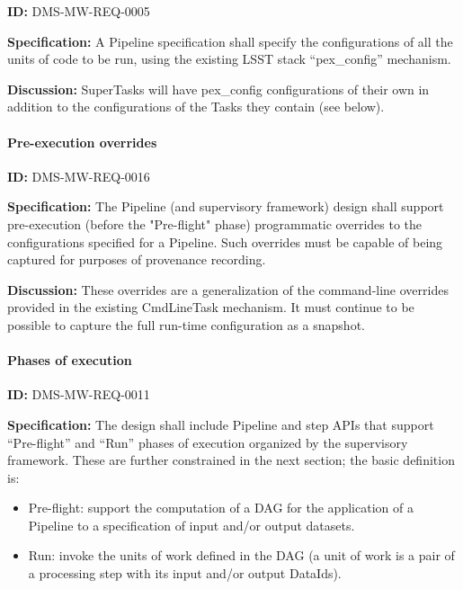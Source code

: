 \documentclass[SE,toc,lsstdraft]{lsstdoc}
\begin{document}
\label{DMS-MW-REQ-0005}
\textbf{ID:} DMS-MW-REQ-0005

\textbf{Specification:}
A Pipeline specification shall specify the configurations of all the units of code to be run, using the existing LSST stack “pex\_config” mechanism.

\textbf{Discussion:}
SuperTasks will have pex\_config configurations of their own in addition to the configurations of the Tasks they contain (see below).

\paragraph{Pre-execution overrides}\hfill  %

\label{DMS-MW-REQ-0016}
\textbf{ID:} DMS-MW-REQ-0016

\textbf{Specification:}
The Pipeline (and supervisory framework) design shall support pre-execution (before the "Pre-flight" phase) programmatic overrides to the configurations specified for a Pipeline. Such overrides must be capable of being captured for purposes of provenance recording.

\textbf{Discussion:}
These overrides are a generalization of the command-line overrides provided in the existing CmdLineTask mechanism. It must continue to be possible to capture the full run-time configuration as a snapshot.

\paragraph{Phases of execution}\hfill  %

\label{DMS-MW-REQ-0011}
\textbf{ID:} DMS-MW-REQ-0011

\textbf{Specification:}
The design shall include Pipeline and step APIs that support “Pre-flight” and “Run” phases of execution organized by the supervisory framework. These are further constrained in the next section; the basic definition is:

    \begin{itemize}
\item
Pre-flight: support the computation of a DAG for the application of a Pipeline to a specification of input and/or output datasets.

\item
Run: invoke the units of work defined in the DAG (a unit of work is a pair of a processing step with its input and/or output DataIds).

    \end{itemize}
\end{document}
